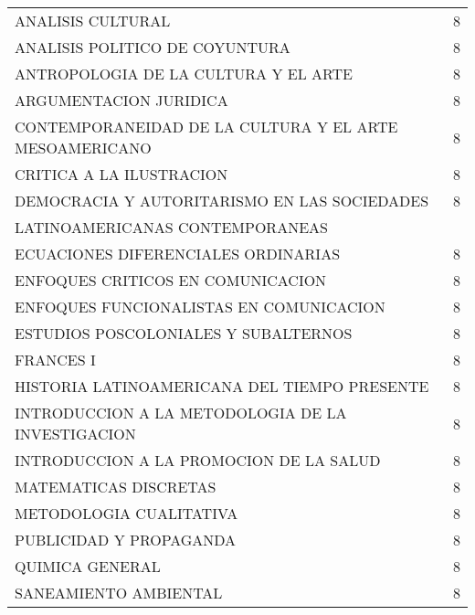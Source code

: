 \documentclass[12pt]{article}
\begin{document}
\begin{table}[ht]
{\begin{tabular}{lr}
  ANALISIS CULTURAL & 8 \\ 
  ANALISIS POLITICO DE COYUNTURA & 8 \\ 
  ANTROPOLOGIA DE LA CULTURA Y EL ARTE & 8 \\ 
  ARGUMENTACION JURIDICA & 8 \\ 
  CONTEMPORANEIDAD DE LA CULTURA Y EL ARTE MESOAMERICANO & 8 \\ 
  CRITICA A LA ILUSTRACION & 8 \\ 
  DEMOCRACIA Y AUTORITARISMO EN LAS SOCIEDADES & 8 \\ 
  LATINOAMERICANAS CONTEMPORANEAS &  \\ 
  ECUACIONES DIFERENCIALES ORDINARIAS & 8 \\ 
  ENFOQUES CRITICOS EN COMUNICACION & 8 \\ 
  ENFOQUES FUNCIONALISTAS EN COMUNICACION & 8 \\ 
  ESTUDIOS POSCOLONIALES Y SUBALTERNOS & 8 \\ 
  FRANCES I & 8 \\ 
  HISTORIA LATINOAMERICANA DEL TIEMPO PRESENTE & 8 \\ 
  INTRODUCCION A LA METODOLOGIA DE LA INVESTIGACION & 8 \\ 
  INTRODUCCION A LA PROMOCION DE LA SALUD & 8 \\ 
  MATEMATICAS DISCRETAS & 8 \\ 
  METODOLOGIA CUALITATIVA & 8 \\ 
  PUBLICIDAD Y PROPAGANDA & 8 \\ 
  QUIMICA GENERAL & 8 \\ 
  SANEAMIENTO AMBIENTAL & 8 \\ 
   \hline
\end{tabular}}
\end{table}
\end{document}
